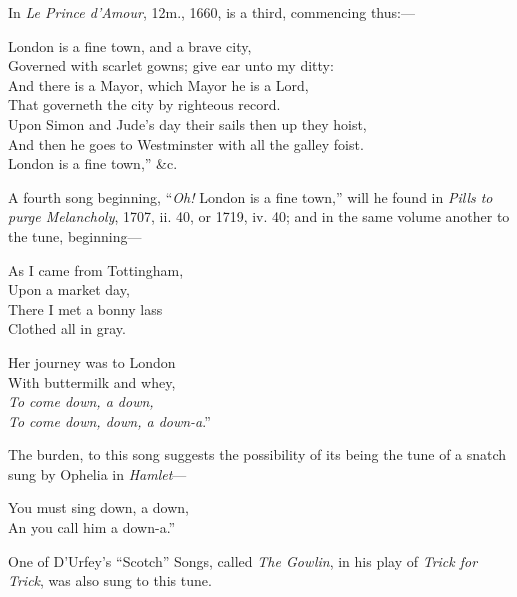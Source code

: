 In \textit{Le Prince d’Amour}, 12m., 1660, is a third, commencing thus:—
\settowidth{\versewidth}{Governed with scarlet gowns; give ear unto my ditty:}
\begin{scverse}London is a fine town, and a brave city,\\
Governed with scarlet gowns; give ear unto my ditty:\\
And there is a Mayor, which Mayor he is a Lord,\\
That governeth the city by righteous record.\\
Upon Simon and Jude’s day their sails then up they hoist,\\
And then he goes to Westminster with all the galley foist.\\
\vin\vin\vin\vin London is a fine town,” \&c.
\end{scverse}
A fourth song beginning, “\textit{Oh!} London is a fine town,” will he found in \textit{Pills to
purge Melancholy}, 1707, ii. 40, or 1719, iv. 40; and in the same volume another
to the tune, beginning—
\settowidth{\versewidth}{As I came from Tottingham,}
\begin{dcverse}\begin{altverse}
As I came from Tottingham,\\
Upon a market day,\\
There I met a bonny lass\\
Clothed all in gray.
\end{altverse}

\begin{altverse}
Her journey was to London\\
With buttermilk and whey,\\
\textit{To come down, a down,\\
To come down, down, a down-a}.”
\end{altverse}
\end{dcverse}
The burden, to this song suggests the possibility of its being the tune of a snatch
sung by Ophelia in \textit{Hamlet}—
\settowidth{\versewidth}{You must sing down, a down,}
\begin{scverse}You must sing down, a down,\\
An you call him a down-a.”
\end{scverse}
One of D’Urfey’s “Scotch” Songs, called \textit{The Gowlin}, in his play of \textit{Trick for
Trick}, was also sung to this tune.

